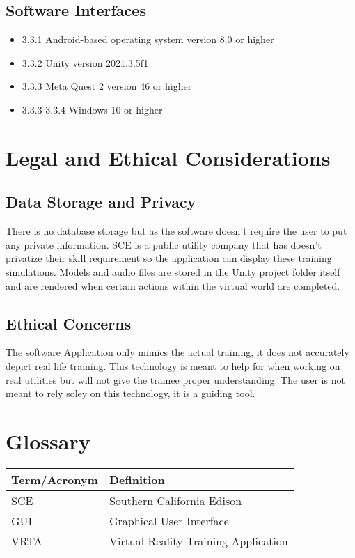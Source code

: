 \documentclass[12pt]{article}
\begin{document}
\subsection{Software Interfaces}
\begin{itemize}
    \item 3.3.1 Android-based operating system version 8.0 or higher
    \item 3.3.2 Unity version 2021.3.5f1
    \item 3.3.3 Meta Quest 2 version 46 or higher
    \item 3.3.3 3.3.4 Windows 10 or higher
\end{itemize}


\section{Legal and Ethical Considerations}
\subsection{Data Storage and Privacy}
There is no database storage but as the software doesn't require the user to put any private information.
SCE is a public utility company that has doesn't privatize their skill requirement so the application can display these training simulations.
Models and audio files are stored in the Unity project folder itself and are rendered when certain actions within the virtual world
are completed. 

\subsection{Ethical Concerns}
The software Application only mimics the actual training, it does not accurately depict real life training.
This technology is meant to help for when working on real utilities but will not give the trainee proper understanding.
The user is not meant to rely soley on this technology, it is a guiding tool.

\section*{Glossary}
\begin{longtable}{|p{4cm}|p{10cm}|}
\hline
\textbf{Term/Acronym} & \textbf{Definition} \\
\hline
SCE & Southern California Edison \\
GUI & Graphical User Interface \\
VRTA & Virtual Reality Training Application \\
\hline
\end{longtable}
\end{document}
